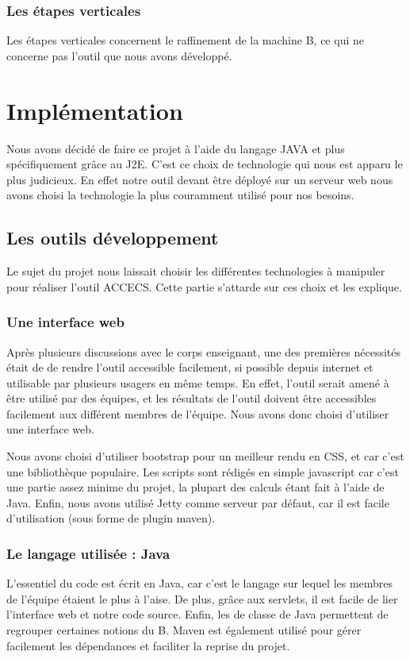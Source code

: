 \documentclass{article}
\begin{document}
\subsubsection{Les étapes verticales}
    Les étapes verticales concernent le raffinement de la machine B, ce qui ne concerne pas l'outil que nous avons développé. 
        
\section{Implémentation}
Nous avons décidé de faire ce projet à l'aide du langage JAVA et plus spécifiquement grâce au J2E. C'est ce choix de technologie qui nous est apparu le plus judicieux. En effet notre outil devant être déployé sur un serveur web nous avons choisi la technologie la plus couramment utilisé pour nos besoins. 

\subsection{Les outils développement}
	Le sujet du projet nous laissait choisir les différentes technologies à manipuler pour réaliser l'outil ACCECS. Cette partie s'attarde sur ces choix et les explique.
    
\subsubsection{Une interface web}
	Après plusieurs discussions avec le corps enseignant, une des premières nécessités était de de rendre l'outil accessible facilement, si possible depuis internet et utilisable par plusieurs usagers en même temps. En effet, l'outil serait amené à être utilisé par des équipes, et les résultats de l'outil doivent être accessibles facilement aux différent membres de l'équipe. Nous avons donc choisi d'utiliser une interface web.
	
	\bigskip
	
	Nous avons choisi d'utiliser bootstrap pour un meilleur rendu en CSS, et car c'est une bibliothèque populaire. Les scripts sont rédigés en simple javascript car c'est une partie assez minime du projet, la plupart des calculs étant fait à l'aide de Java. Enfin, nous avons utilisé Jetty comme serveur par défaut, car il est facile d'utilisation (sous forme de plugin maven).
	
\subsubsection{Le langage utilisée : Java}
    L'essentiel du code est écrit en Java, car c'est le langage sur lequel les membres de l'équipe étaient le plus à l'aise. De plus, grâce aux servlets, il est facile de lier l'interface web et notre code source. Enfin, les de classe de Java permettent de regrouper certaines notions du B. Maven est également utilisé pour gérer facilement les dépendances et faciliter la reprise du projet.
\end{document}
